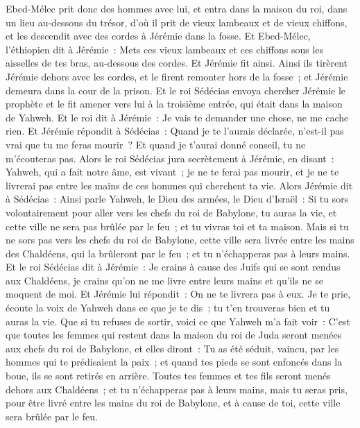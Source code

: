 \begin{multicols}{2}
Ebed-Mélec prit donc des hommes avec lui, et entra dans la maison du roi, dans un lieu au-dessous du trésor, d'où il prit de vieux lambeaux et de vieux chiffons, et les descendit avec des cordes à Jérémie dans la fosse.
Et Ebed-Mélec, l'éthiopien dit à Jérémie~: Mets ces vieux lambeaux et ces chiffons sous les aisselles de tes bras, au-dessous des cordes. Et Jérémie fit ainsi.
Ainsi ils tirèrent Jérémie dehors avec les cordes, et le firent remonter hors de la fosse~; et Jérémie demeura dans la cour de la prison.
Et le roi Sédécias envoya chercher Jérémie le prophète et le fit amener vers lui à la troisième entrée, qui était dans la maison de Yahweh. Et le roi dit à Jérémie~: Je vais te demander une chose, ne me cache rien.
Et Jérémie répondit à Sédécias~: Quand je te l'aurais déclarée, n'est-il pas vrai que tu me feras mourir~? Et quand je t'aurai donné conseil, tu ne m'écouteras pas.
Alors le roi Sédécias jura secrètement à Jérémie, en disant~: Yahweh, qui a fait notre âme, est vivant~; je ne te ferai pas mourir, et je ne te livrerai pas entre les mains de ces hommes qui cherchent ta vie.
Alors Jérémie dit à Sédécias~: Ainsi parle Yahweh, le Dieu des armées, le Dieu d'Israël~: Si tu sors volontairement pour aller vers les chefs du roi de Babylone, tu auras la vie, et cette ville ne sera pas brûlée par le feu~; et tu vivras toi et ta maison.
Mais si tu ne sors pas vers les chefs du roi de Babylone, cette ville sera livrée entre les mains des Chaldéens, qui la brûleront par le feu~; et tu n'échapperas pas à leurs mains.
Et le roi Sédécias dit à Jérémie~: Je crains à cause des Juifs qui se sont rendus aux Chaldéens, je crains qu'on ne me livre entre leurs mains et qu'ils ne se moquent de moi.
Et Jérémie lui répondit~: On ne te livrera pas à eux. Je te prie, écoute la voix de Yahweh dans ce que je te dis~; tu t'en trouveras bien et tu auras la vie.
Que si tu refuses de sortir, voici ce que Yahweh m'a fait voir~:
C'est que toutes les femmes qui restent dans la maison du roi de Juda seront menées aux chefs du roi de Babylone, et elles diront~: Tu as été séduit, vaincu, par les hommes qui te prédisaient la paix~; et quand tes pieds se sont enfoncés dans la boue, ils se sont retirés en arrière.
Toutes tes femmes et tes fils seront menés dehors aux Chaldéens~; et tu n'échapperas pas à leurs mains, mais tu seras pris, pour être livré entre les mains du roi de Babylone, et à cause de toi, cette ville sera brûlée par le feu.

\end{multicols}
